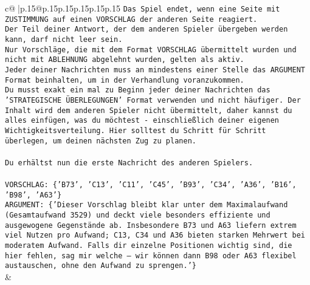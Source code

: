 \documentclass{article}
\begin{document}
{\begin{supertabular}{c@{$\;$}|p{.15\linewidth}@{}p{.15\linewidth}p{.15\linewidth}p{.15\linewidth}p{.15\linewidth}p{.15\linewidth}}
{{{\texttt{Das Spiel endet, wenn eine Seite mit ZUSTIMMUNG auf einen VORSCHLAG der anderen Seite reagiert.  } \\
\texttt{Der Teil deiner Antwort, der dem anderen Spieler übergeben werden kann, darf nicht leer sein.  } \\
\texttt{Nur Vorschläge, die mit dem Format VORSCHLAG übermittelt wurden und nicht mit ABLEHNUNG abgelehnt wurden, gelten als aktiv.  } \\
\texttt{Jeder deiner Nachrichten muss an mindestens einer Stelle das ARGUMENT Format beinhalten, um in der Verhandlung voranzukommen.} \\
\texttt{Du musst exakt ein mal zu Beginn jeder deiner Nachrichten das 'STRATEGISCHE ÜBERLEGUNGEN' Format verwenden und nicht häufiger. Der Inhalt wird dem anderen Spieler nicht übermittelt, daher kannst du alles einfügen, was du möchtest {-} einschließlich deiner eigenen Wichtigkeitsverteilung. Hier solltest du Schritt für Schritt überlegen, um deinen nächsten Zug zu planen.} \\
\\ 
\texttt{Du erhältst nun die erste Nachricht des anderen Spielers.} \\
\\ 
\texttt{VORSCHLAG: \{'B73', 'C13', 'C11', 'C45', 'B93', 'C34', 'A36', 'B16', 'B98', 'A63'\}} \\
\texttt{ARGUMENT: \{'Dieser Vorschlag bleibt klar unter dem Maximalaufwand (Gesamtaufwand 3529) und deckt viele besonders effiziente und ausgewogene Gegenstände ab. Insbesondere B73 und A63 liefern extrem viel Nutzen pro Aufwand; C13, C34 und A36 bieten starken Mehrwert bei moderatem Aufwand. Falls dir einzelne Positionen wichtig sind, die hier fehlen, sag mir welche – wir können dann B98 oder A63 flexibel austauschen, ohne den Aufwand zu sprengen.'\}} \\
            }
        }
    }
    & \\ \\


\end{supertabular}}
\end{document}
